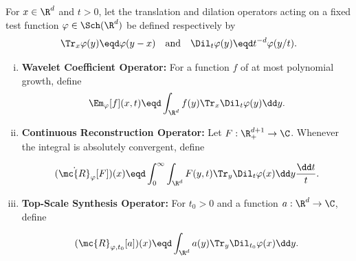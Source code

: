 \begin{definition} \label{def:wavelet-operators} For $x \in \R^d$ and $t > 0$, let the translation and dilation operators acting on a fixed test function $\varphi \in \Sch(\R^d)$ be defined respectively by
\[

\Tr_x\varphi(y) \eqd \varphi(y-x) \quad \text{and} \quad \Dil_t\varphi(y) \eqd t^{-d}\varphi(y/t).

\]
\begin{enumerate}[(i)] \item \textbf{Wavelet Coefficient Operator:} For a function $f$ of at most polynomial growth, define
\begin{equation} \label{eq:wavelet-coefficient-fixed-test}
\Em_{\varphi}[f](x,t) \eqd \int_{\R^d} f(y)\Tr_x\Dil_t\varphi(y)\dd y.

\end{equation}


\item \textbf{Continuous Reconstruction Operator:} Let $F:\R^{d+1}_+\to\C$.
Whenever the integral is absolutely convergent, define



\begin{equation} \label{eq:reconstruction-operator}
(\dot{\mc{R}}_{\varphi}[F])(x) \eqd \int_0^\infty \int_{\R^d} F(y,t)\Tr_y\Dil_t\varphi(x) \dd y\frac{\dd t}{t}.

\end{equation}


\item \textbf{Top-Scale Synthesis Operator:} For $t_0>0$ and a function $a:\R^d\to\C$, define


\begin{equation} \label{eq:top-scale-synthesis-operator}
(\mc{R}_{\varphi,t_0}[a])(x) \eqd \int_{\R^d} a(y)\Tr_y\Dil_{t_0}\varphi(x)\dd y.

\end{equation}
\end{enumerate}
\end{definition}


